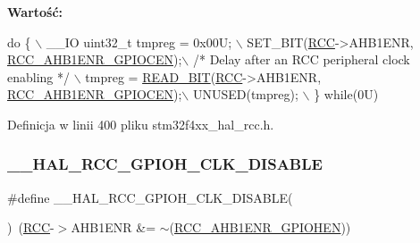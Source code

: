 {\bfseries Wartość\+:}
\begin{DoxyCode}
\textcolor{keywordflow}{do} \{ \(\backslash\)
                                        \_\_IO uint32\_t tmpreg = 0x00U; \(\backslash\)
                                        SET\_BIT(\hyperlink{group___peripheral__declaration_ga74944438a086975793d26ae48d5882d4}{RCC}->AHB1ENR, 
      \hyperlink{group___peripheral___registers___bits___definition_gae8a8b42e33aef2a7bc2d41ad9d231733}{RCC\_AHB1ENR\_GPIOCEN});\(\backslash\)
                                        \textcolor{comment}{/* Delay after an RCC peripheral clock enabling */} \(\backslash\)
                                        tmpreg = \hyperlink{group___exported__macro_ga822bb1bb9710d5f2fa6396b84e583c33}{READ\_BIT}(\hyperlink{group___peripheral__declaration_ga74944438a086975793d26ae48d5882d4}{RCC}->AHB1ENR, 
      \hyperlink{group___peripheral___registers___bits___definition_gae8a8b42e33aef2a7bc2d41ad9d231733}{RCC\_AHB1ENR\_GPIOCEN});\(\backslash\)
                                        UNUSED(tmpreg); \(\backslash\)
                                          \} \textcolor{keywordflow}{while}(0U)
\end{DoxyCode}


Definicja w linii 400 pliku stm32f4xx\+\_\+hal\+\_\+rcc.\+h.

\mbox{\label{group___r_c_c___a_h_b1___clock___enable___disable_ga1eb7dd0a520cef518fb624bf7117b7e1}} 
\subsubsection{\texorpdfstring{\+\_\+\+\_\+\+H\+A\+L\+\_\+\+R\+C\+C\+\_\+\+G\+P\+I\+O\+H\+\_\+\+C\+L\+K\+\_\+\+D\+I\+S\+A\+B\+LE}{\_\_HAL\_RCC\_GPIOH\_CLK\_DISABLE}}
{\footnotesize\ttfamily \#define \+\_\+\+\_\+\+H\+A\+L\+\_\+\+R\+C\+C\+\_\+\+G\+P\+I\+O\+H\+\_\+\+C\+L\+K\+\_\+\+D\+I\+S\+A\+B\+LE(\begin{DoxyParamCaption}{ }\end{DoxyParamCaption})~(\hyperlink{group___peripheral__declaration_ga74944438a086975793d26ae48d5882d4}{R\+CC}-\/$>$A\+H\+B1\+E\+NR \&= $\sim$(\hyperlink{group___peripheral___registers___bits___definition_gadb16afc550121895822ebb22108196b6}{R\+C\+C\+\_\+\+A\+H\+B1\+E\+N\+R\+\_\+\+G\+P\+I\+O\+H\+EN}))}




